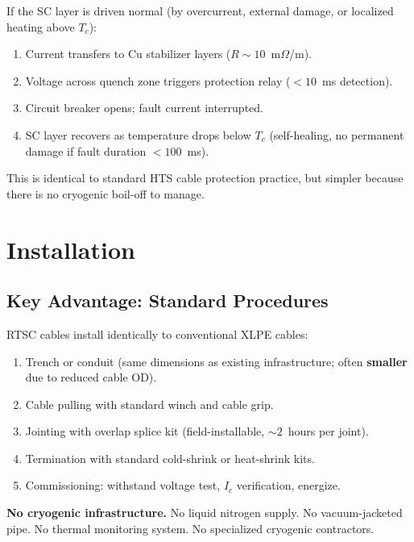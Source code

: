 \documentclass[11pt, a4paper]{article}
\begin{document}
If the SC layer is driven normal (by overcurrent, external damage,
or localized heating above $T_c$):

\begin{enumerate}[nosep]
  \item Current transfers to Cu stabilizer layers ($R \sim 10$~m$\Omega$/m).
  \item Voltage across quench zone triggers protection relay
        ($< 10$~ms detection).
  \item Circuit breaker opens; fault current interrupted.
  \item SC layer recovers as temperature drops below $T_c$
        (self-healing, no permanent damage if fault duration
        $< 100$~ms).
\end{enumerate}

This is identical to standard HTS cable protection practice, but
simpler because there is no cryogenic boil-off to manage.

\section{Installation}
\label{sec:installation}

\subsection{Key Advantage: Standard Procedures}

RTSC cables install identically to conventional XLPE cables:

\begin{enumerate}[nosep]
  \item Trench or conduit (same dimensions as existing infrastructure;
        often \textbf{smaller} due to reduced cable OD).
  \item Cable pulling with standard winch and cable grip.
  \item Jointing with overlap splice kit (field-installable,
        $\sim 2$~hours per joint).
  \item Termination with standard cold-shrink or heat-shrink kits.
  \item Commissioning: withstand voltage test, $I_c$ verification,
        energize.
\end{enumerate}

\textbf{No cryogenic infrastructure.} No liquid nitrogen supply.
No vacuum-jacketed pipe. No thermal monitoring system. No
specialized cryogenic contractors.
\end{document}
